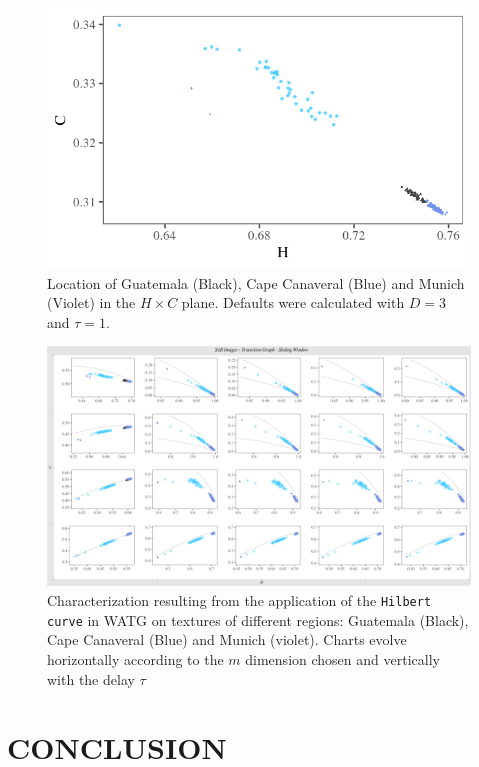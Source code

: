 \documentclass{isprs}
\begin{document}
\begin{figure}[hbt]
	\centering
	\includegraphics[width=0.9\columnwidth]{Figures/transitionGraphD3t1.png}
	\caption{Location of Guatemala (Black), Cape Canaveral (Blue) and Munich (Violet) in the $H \times C$ plane. Defaults were calculated with $D = 3$ and $\tau = 1$.}
	\label{fig:D3T1}
\end{figure}


\begin{figure}
	\centering
	\includegraphics[width=1.05\textwidth]{Figures/transitionGraphHilbert.pdf}
	\caption{Characterization resulting from the application of the \texttt{Hilbert curve} in WATG on textures of different regions: Guatemala (Black), Cape Canaveral (Blue) and Munich (violet). Charts evolve horizontally according to the $m$ dimension chosen and vertically with the delay $\tau$}
	\label{fig:Regions}
\end{figure}


\section{CONCLUSION}\label{Conclusion}
\end{document}
